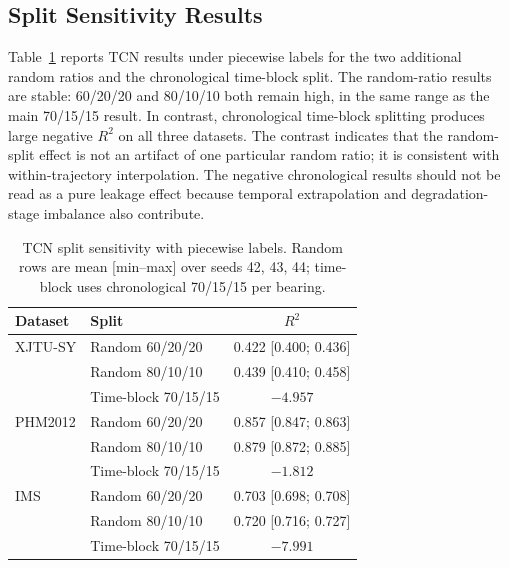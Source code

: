 \documentclass[pdflatex,sn-mathphys-num]{sn-jnl}
\begin{document}
\subsection{Split Sensitivity Results}
Table~\ref{tab:sensitivity} reports TCN results under piecewise labels for the two additional random ratios and the chronological time-block split. The random-ratio results are stable: 60/20/20 and 80/10/10 both remain high, in the same range as the main 70/15/15 result. In contrast, chronological time-block splitting produces large negative $R^2$ on all three datasets. The contrast indicates that the random-split effect is not an artifact of one particular random ratio; it is consistent with within-trajectory interpolation. The negative chronological results should not be read as a pure leakage effect because temporal extrapolation and degradation-stage imbalance also contribute.

\begin{table}[t]
\centering
\caption{TCN split sensitivity with piecewise labels. Random rows are mean [min--max] over seeds 42, 43, 44; time-block uses chronological 70/15/15 per bearing.}
\label{tab:sensitivity}
\small
\begin{tabular}{llc}
\toprule
Dataset & Split & $R^2$ \\
\midrule
XJTU-SY & Random 60/20/20 & 0.422 [0.400; 0.436] \\
 & Random 80/10/10 & 0.439 [0.410; 0.458] \\
 & Time-block 70/15/15 & $-4.957$ \\
\midrule
PHM2012 & Random 60/20/20 & 0.857 [0.847; 0.863] \\
 & Random 80/10/10 & 0.879 [0.872; 0.885] \\
 & Time-block 70/15/15 & $-1.812$ \\
\midrule
IMS & Random 60/20/20 & 0.703 [0.698; 0.708] \\
 & Random 80/10/10 & 0.720 [0.716; 0.727] \\
 & Time-block 70/15/15 & $-7.991$ \\
\bottomrule
\end{tabular}
\end{table}
\end{document}
